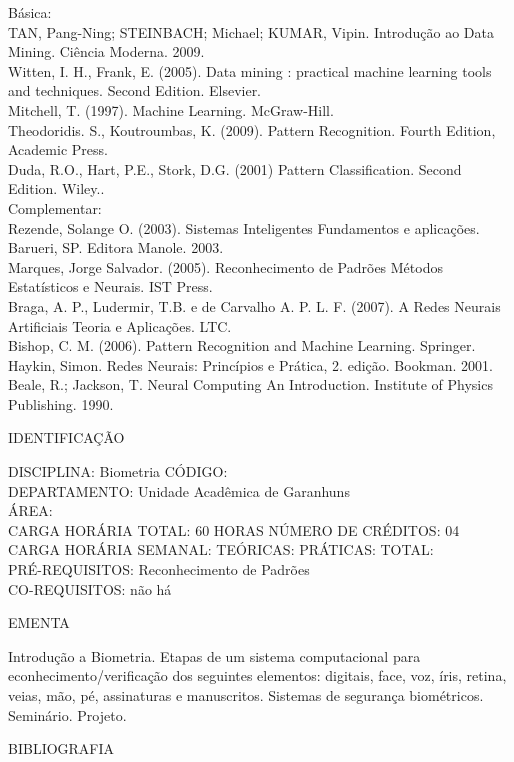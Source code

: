 \documentclass[
	12pt,				%
	openright,			%
  oneside,     %
	a4paper,			%
	english,			%
	french,				%
	spanish,			%
	brazil				%
	]{abntex2}
\begin{document}
\begin{apendicesenv}
Básica:\\
TAN, Pang-Ning; STEINBACH; Michael; KUMAR, Vipin. Introdução ao Data
Mining. Ciência Moderna. 2009.\\
Witten, I. H., Frank, E. (2005). Data mining : practical machine
learning tools and techniques. Second Edition. Elsevier.\\
Mitchell, T. (1997). Machine Learning. McGraw-Hill.\\
Theodoridis. S., Koutroumbas, K. (2009). Pattern Recognition. Fourth
Edition, Academic Press.\\
Duda, R.O., Hart, P.E., Stork, D.G. (2001) Pattern Classification.
Second Edition. Wiley..\\
Complementar:\\
Rezende, Solange O. (2003). Sistemas Inteligentes  Fundamentos e
aplicações. Barueri, SP. Editora Manole. 2003.\\
Marques, Jorge Salvador. (2005). Reconhecimento de Padrões  Métodos
Estatísticos e Neurais. IST Press.\\
Braga, A. P., Ludermir, T.B. e de Carvalho A. P. L. F. (2007). A Redes
Neurais Artificiais  Teoria e Aplicações. LTC.\\
Bishop, C. M. (2006). Pattern Recognition and Machine Learning.
Springer.\\
Haykin, Simon. Redes Neurais: Princípios e Prática, 2. edição. Bookman.
2001.\\
Beale, R.; Jackson, T. Neural Computing  An Introduction. Institute of Physics Publishing. 1990.

\newpage IDENTIFICAÇÃO

DISCIPLINA: Biometria CÓDIGO:\\ 
DEPARTAMENTO: Unidade Acadêmica de Garanhuns\\
ÁREA: \\
CARGA HORÁRIA TOTAL: 60 HORAS NÚMERO DE CRÉDITOS: 04\\
CARGA HORÁRIA SEMANAL: TEÓRICAS: PRÁTICAS: TOTAL: \\
PRÉ-REQUISITOS: Reconhecimento de Padrões\\
CO-REQUISITOS: não há

EMENTA 

Introdução a Biometria. Etapas de um sistema computacional para
econhecimento/verificação dos seguintes elementos: digitais, face, voz, íris, retina, veias, mão, pé, assinaturas e manuscritos. Sistemas de segurança biométricos. Seminário. Projeto.

BIBLIOGRAFIA 


\end{apendicesenv}
\end{document}

